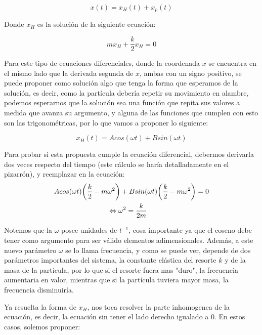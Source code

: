 \documentclass{article}
\begin{document}
\begin{multicols}{2}
\begin{equation}
    x(t) = x_H(t) + x_p(t)
\end{equation}

Donde $x_H$ es la solución de la siguiente ecuación:

\begin{equation}
    m\ddot{x}_H + \frac{k}{2}x_H = 0
\end{equation}

Para este tipo de ecuaciones diferenciales, donde la coordenada $x$ se encuentra en el mismo lado que la derivada segunda de $x$, ambas con un signo positivo, se puede proponer como solución algo que tenga la forma que esperamos de la solución, es decir, como la partícula debería repetir su movimiento en alambre, podemos esperarnos que la solución sea una función que repita sus valores a medida que avanza su argumento, y alguna de las funciones que cumplen con esto son las trigonométricas, por lo que vamos a proponer lo siguiente:

\begin{equation}
    x_H(t) = Acos(\omega t) + Bsin(\omega t)
\end{equation}

Para probar si esta propuesta cumple la ecuación diferencial, debermos derivarla dos veces respecto del tiempo (este cálculo se haría detalladamente en el pizarrón), y reemplazar en la ecuación:
\begin{equation}
    \centering
    \begin{split}
        Acos(\omega t) \bigg(\frac{k}{2} - m&\omega^2 \bigg) + Bsin(\omega t)\bigg( \frac{k}{2} - m\omega^2 \bigg) = 0 \\
        &\Leftrightarrow \omega^2 = \frac{k}{2m}
    \end{split}
\end{equation}

Notemos que la $\omega$ posee unidades de $t^{-1}$, cosa importante ya que el coseno debe tener como argumento para ser válido elementos adimensionales. Además, a este nuevo parámetro $\omega$ se lo llama frecuencia, y como se puede ver, depende de dos parámetros importantes del sistema, la constante elástica del resorte $k$ y de la masa de la partícula, por lo que si el resorte fuera mas "duro", la frecuencia aumentaria en valor, mientras que si la partícula tuviera mayor masa, la frecuencia disminuiría.

Ya resuelta la forma de $x_H$, nos toca resolver la parte inhomogenea de la ecuación, es decir, la ecuación sin tener el lado derecho igualado a $0$. En estos casos, solemos proponer:


\end{multicols}
\end{document}

